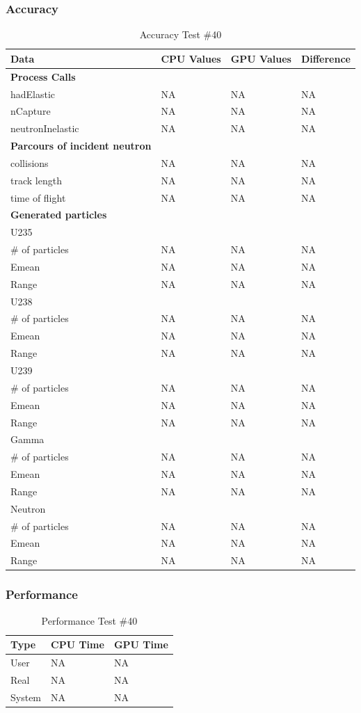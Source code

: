 \documentclass[12pt]{article}
\begin{document}
	\subsubsection{Accuracy}
		\begin{table}[!htbp]
		\centering
		\caption{Accuracy Test \#40}\label{_acc}
		\begin{tabular}{llll}
		\toprule
		\bf Data & CPU Values & GPU Values & Difference\\\midrule
		\bf Process Calls&&&\\
		hadElastic&NA&NA&NA\\
		nCapture&NA&NA&NA\\
		neutronInelastic&NA&NA&NA\\ 
		\bf Parcours of incident neutron&&&\\
		collisions&NA&NA&NA\\
		track length&NA&NA&NA\\
		time of flight&NA&NA&NA\\
		\bf Generated particles&&&\\
		U235&&&\\
		\# of particles&NA&NA&NA\\
		Emean&NA&NA&NA\\
		Range&NA&NA&NA\\
		U238&&&\\
		\# of particles&NA&NA&NA\\
		Emean&NA&NA&NA\\
		Range&NA&NA&NA\\
		U239&&&\\
		\# of particles&NA&NA&NA\\
		Emean&NA&NA&NA\\
		Range&NA&NA&NA\\
		Gamma&&&\\
		\# of particles&NA&NA&NA\\
		Emean&NA&NA&NA\\
		Range&NA&NA&NA\\
		Neutron&&&\\
		\# of particles&NA&NA&NA\\
		Emean&NA&NA&NA\\
		Range&NA&NA&NA\\
		\end{tabular}
		\end{table}
		\break
	\subsubsection{Performance}
		\begin{table}[!htbp]
		\centering
		\caption{Performance Test \#40}\label{_acc}
		\begin{tabular}{lll}
		\toprule
		Type&CPU Time& GPU Time\\\midrule
		User&NA&NA\\
		Real&NA&NA\\
		System&NA&NA\\
		\end{tabular}
		\end{table}
\end{document}
